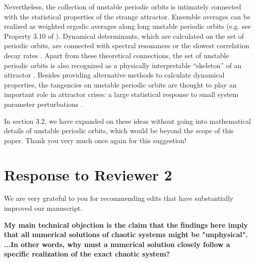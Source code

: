 \documentclass[11pt]{article}
\newcommand{\reviewerTwo}[1]{{\color{azure}\textbf{#1}}}
\begin{document}
Nevertheless, the collection of unstable periodic orbits is intimately connected with the statistical properties of the strange attractor. Ensemble averages can be realized as weighted ergodic averages along long unstable periodic orbits (e.g. see Property 3.10 of \cite{llave}). Dynamical determinants, which are calculated on the set of periodic orbits, are connected with spectral resonances or the slowest correlation decay rates \cite{baladi-book}. Apart from these theoretical connections, the set of unstable periodic orbits is also recognized as a physically interpretable ``skeleton'' of an attractor \cite{cvitanovic1}. Besides providing alternative methods to calculate dynamical properties, the tangencies on unstable periodic orbits are thought to play an important role in attractor crises: a large statistical response to small system parameter perturbations \cite{berry}\cite{grebogi1}.

In section 3.2, we have expanded on these ideas without going into mathematical details of unstable periodic orbits, which would be beyond the scope of this paper. Thank you very much once again for this suggestion! 

\section*{Response to Reviewer 2}
We are very grateful to you for recommending edits that have substantially improved our manuscript.

\reviewerTwo{My main technical objection is the claim that the findings here imply that all numerical solutions of chaotic systems might be "unphysical". ...In other words, why must a numerical solution closely follow a specific realization of the exact chaotic system? }
\end{document}
